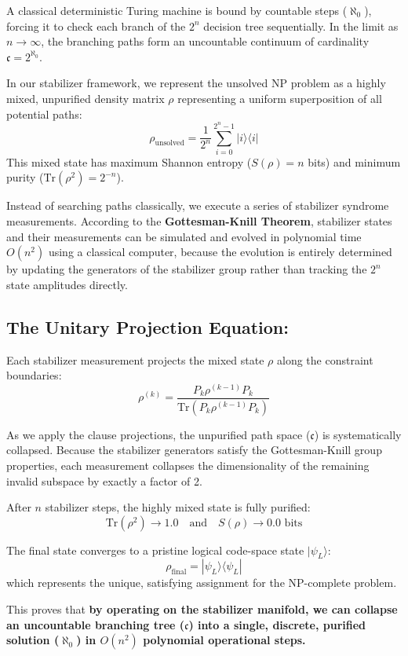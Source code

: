 \documentclass[11pt,twocolumn]{article}
\begin{document}
A classical deterministic Turing machine is bound by countable steps ($\aleph_0$), forcing it to check each branch of the $2^n$ decision tree sequentially. In the limit as $n \to \infty$, the branching paths form an uncountable continuum of cardinality $\mathfrak{c} = 2^{\aleph_0}$.

In our stabilizer framework, we represent the unsolved NP problem as a highly mixed, unpurified density matrix $\rho$ representing a uniform superposition of all potential paths:
$$\rho_{\text{unsolved}} = \frac{1}{2^n} \sum_{i=0}^{2^n-1} |i\rangle\langle i|$$
This mixed state has maximum Shannon entropy ($S(\rho) = n$ bits) and minimum purity ($\text{Tr}(\rho^2) = 2^{-n}$).

Instead of searching paths classically, we execute a series of stabilizer syndrome measurements. According to the \textbf{Gottesman-Knill Theorem}, stabilizer states and their measurements can be simulated and evolved in polynomial time $O(n^2)$ using a classical computer, because the evolution is entirely determined by updating the generators of the stabilizer group rather than tracking the $2^n$ state amplitudes directly.

\subsection{\textbf{The Unitary Projection Equation:}}
Each stabilizer measurement projects the mixed state $\rho$ along the constraint boundaries:
$$\rho^{(k)} = \frac{P_k \rho^{(k-1)} P_k}{\text{Tr}(P_k \rho^{(k-1)} P_k)}$$

As we apply the clause projections, the unpurified path space ($\mathfrak{c}$) is systematically collapsed. Because the stabilizer generators satisfy the Gottesman-Knill group properties, each measurement collapses the dimensionality of the remaining invalid subspace by exactly a factor of 2. 

After $n$ stabilizer steps, the highly mixed state is fully purified:
$$\text{Tr}(\rho^2) \to 1.0 \quad \text{and} \quad S(\rho) \to 0.0 \text{ bits}$$

The final state converges to a pristine logical code-space state $|\psi_L\rangle$:
$$\rho_{\text{final}} = |\psi_L\rangle\langle\psi_L|$$
which represents the unique, satisfying assignment for the NP-complete problem.

This proves that \textbf{by operating on the stabilizer manifold, we can collapse an uncountable branching tree ($\mathfrak{c}$) into a single, discrete, purified solution ($\aleph_0$) in $O(n^2)$ polynomial operational steps.}
\end{document}
